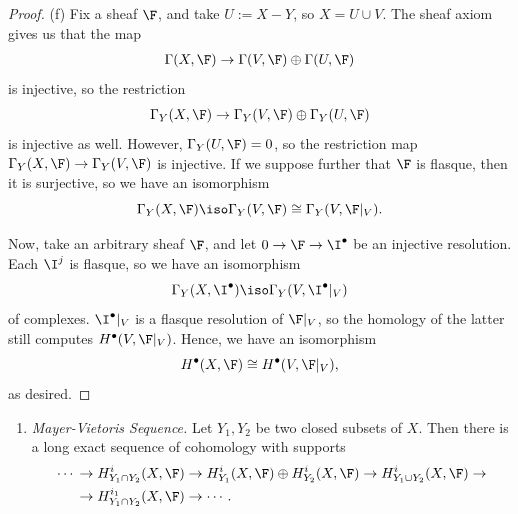 \documentclass[12pt]{amsart}
\begin{document}
\begin{proof}
  (f) Fix a sheaf $\F$, and take $U:=X-Y$, so $X=U\cup V$.
  The sheaf axiom gives us that the map
  \begin{align*}
    \Gamma(X,\F)\to \Gamma(V,\F)\oplus \Gamma(U,\F)
  \end{align*}
  is injective, so the restriction
  \[
    \Gamma_Y(X,\F)\to \Gamma_Y(V,\F)\oplus \Gamma_Y(U,\F)
  \] 
  is injective as well.
  However, $\Gamma_Y(U,\F)=0$, so the restriction map $\Gamma_Y(X,\F)\to \Gamma_Y(V,\F)$ is injective.
  If we suppose further that $\F$ is flasque, then it is surjective, so we have an isomorphism
  \[
    \Gamma_Y(X,\F) \iso \Gamma_Y(V,\F)\cong \Gamma_Y(V,\F|_V).
  \] 

  Now, take an arbitrary sheaf $\F$, and let $0\to \F\to \I^\bullet$ be an injective resolution.
  Each $\I^j$ is flasque, so we have an isomorphism
  \[
    \Gamma_Y(X,\I^\bullet)\iso \Gamma_Y(V,\I^\bullet|_V)
  \] 
  of complexes.
  $\I^\bullet|_V$ is a flasque resolution of $\F|_V$, so the homology of the latter still computes $H^\bullet(V,\F|_V)$.
  Hence, we have an isomorphism
  \[
    H^\bullet(X,\F)\cong H^\bullet(V,\F|_V),
  \] 
  as desired.
\end{proof}

\begin{enumerate}
  \item[2.4.] {
      \emph{Mayer-Vietoris Sequence.} 
      Let $Y_1,Y_2$ be two closed subsets of $X$.
      Then there is a long exact sequence of cohomology with supports
      \begin{align*}
        \cdots\,&\to H_{Y_1\cap Y_2}^i(X,\F) \to H_{Y_1}^i(X,\F)\oplus H_{Y_2}^i(X,\F)\to H_{Y_1\cup Y_2}^i(X,\F) \to \\
        &\to H_{Y_1\cap Y_2}^{i_1}(X,\F)\to \cdots.
      \end{align*}
    }
\end{enumerate}
\end{document}
